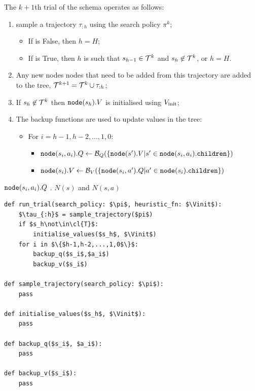 
        The $k+1$th trial of the \thtspp\ewe schema operates as follows: 
        \begin{enumerate}
            \item sample a trajectory $\tau_{:h}$ using the search policy $\pi^{k}$;
            \begin{itemize}
                \item If \mctsmode\ewe is False, then $h=H$;
                \item If \mctsmode\ewe is True, then $h$ is such that $s_{h-1}\in\mathcal{T}^k$ and $s_h\not\in\mathcal{T}^k$, or $h=H$.
            \end{itemize}
            \item Any new nodes nodes that need to be added from this trajectory are added to the tree, $\mathcal{T}^{k+1} = \mathcal{T}^k \cup \tau_{:h}$;
            \item If $s_h\not\in\mathcal{T}^k$ then ${\textnormal{\texttt{node}}}(s_h).V$ is initialised using ${V_{\textnormal{init}}}$;
            \item The backup functions are used to update values in the tree:
            \begin{itemize}
                \item For $i={h-1,h-2,...,1,0}$:
                \begin{itemize}
                    \item ${\textnormal{\texttt{node}}}(s_i,a_i).Q \leftarrow \mathcal{B}_Q(\{{\textnormal{\texttt{node}}}(s').V | s'\in{\textnormal{\texttt{node}}}(s_i,a_i).{\textnormal{\texttt{children}}}\})$
                    \item ${\textnormal{\texttt{node}}}(s_i).V \leftarrow \mathcal{B}_V(\{{\textnormal{\texttt{node}}}(s_i,a').Q | a'\in{\textnormal{\texttt{node}}}(s_i).{\textnormal{\texttt{children}}}\})$
                \end{itemize}
            \end{itemize}
        \end{enumerate}

         ${\textnormal{\texttt{node}}}(s_i,a_i).Q$ .  $N(s)$ and $N(s,a)$
        \begin{lstlisting}[caption={Psuedocode for running a trial in \thtspp}, label={lst:thts_trial}]
def run_trial(search_policy: $\pi$, heuristic_fn: $\Vinit$):
    $\tau_{:h}$ = sample_trajectory($pi$)
    if $s_h\not\in\cl{T}$:
        initialise_values($s_h$, $\Vinit$)
    for i in $\{$h-1,h-2,...,1,0$\}$:
        backup_q($s_i$,$a_i$)
        backup_v($s_i$)

def sample_trajectory(search_policy: $\pi$):
    pass

def initialise_values($s_h$, $\Vinit$):
    pass 

def backup_q($s_i$, $a_i$):
    pass
    
def backup_v($s_i$):
    pass
        \end{lstlisting}

